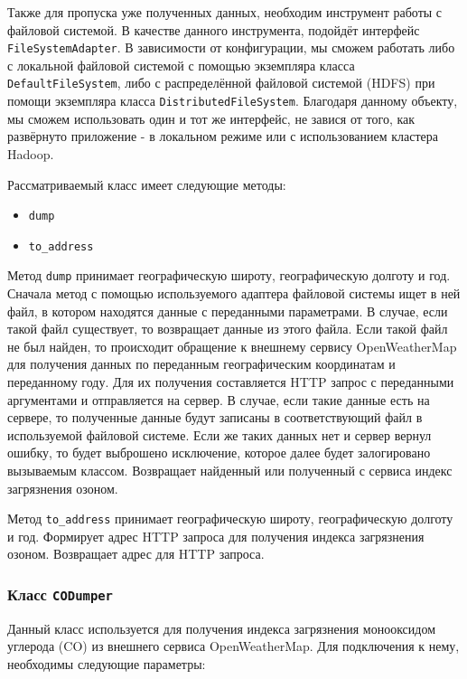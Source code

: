 Также для пропуска уже полученных данных, необходим инструмент работы с файловой системой.
В качестве данного инструмента, подойдёт интерфейс \texttt{FileSystemAdapter}.
В зависимости от конфигурации, мы сможем работать либо с локальной файловой системой с помощью экземпляра класса \texttt{DefaultFileSystem}, либо с распределённой файловой системой (HDFS) при помощи экземпляра класса \texttt{DistributedFileSystem}.
Благодаря данному объекту, мы сможем использовать один и тот же интерфейс, не завися от того, как развёрнуто приложение - в локальном режиме или с использованием кластера Hadoop.

Рассматриваемый класс имеет следующие методы:
\begin{itemize}
\item \texttt{dump}
\item \texttt{to\_address}
\end{itemize}

Метод \texttt{dump} принимает географическую широту, географическую долготу и год.
Сначала метод с помощью используемого адаптера файловой системы ищет в ней файл, в котором находятся данные с переданными параметрами.
В случае, если такой файл существует, то возвращает данные из этого файла.
Если такой файл не был найден, то происходит обращение к внешнему сервису OpenWeatherMap для получения данных по переданным географическим координатам и переданному году.
Для их получения составляется HTTP запрос с переданными аргументами и отправляется на сервер.
В случае, если такие данные есть на сервере, то полученные данные будут записаны в соответствующий файл в используемой файловой системе.
Если же таких данных нет и сервер вернул ошибку, то будет выброшено исключение, которое далее будет залогировано вызываемым классом.
Возвращает найденный или полученный с сервиса индекс загрязнения озоном.

Метод \texttt{to\_address} принимает географическую широту, географическую долготу и год.
Формирует адрес HTTP запроса для получения индекса загрязнения озоном.
Возвращает адрес для HTTP запроса.



\subsubsection{Класс \texttt{CODumper}}
Данный класс используется для получения индекса загрязнения монооксидом углерода ($ \text{CO} $) из внешнего сервиса OpenWeatherMap.
Для подключения к нему, необходимы следующие параметры:

